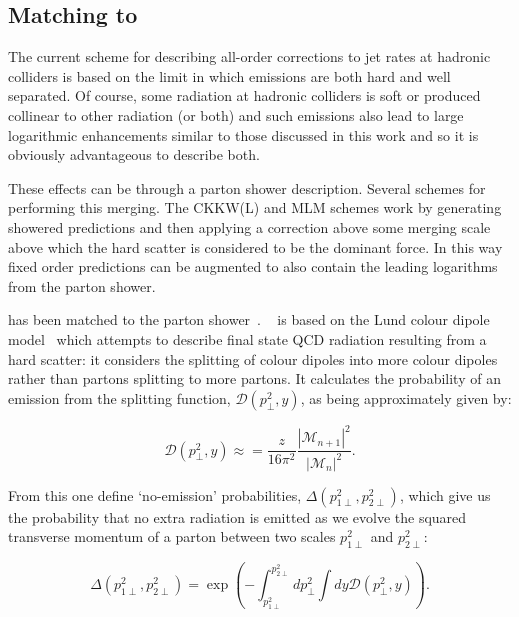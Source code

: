 	\subsection{Matching to \ARIADNE}

		The current scheme for describing all-order corrections to jet rates at hadronic colliders
		is based on the limit in which emissions are both hard and well separated.  Of course, some
		radiation at hadronic colliders is soft or produced collinear to other radiation (or both) and
		such emissions also lead to large logarithmic enhancements similar to those discussed in this
		work and so it is obviously advantageous to describe both.

		These effects can be through a parton shower description.  Several schemes for performing this
		merging.  The CKKW(L) and MLM schemes work by generating showered predictions and then applying
		a correction above some merging scale above which the hard scatter is considered to be the
		dominant force.  In this way fixed order predictions can be augmented to also contain the leading
		logarithms from the parton shower.

		\HEJ has been matched to the \ARIADNE parton shower~\cite{Andersen:2011zd}.  \ARIADNE~\cite{Lonnblad:1992tz}
		is based on the Lund colour dipole model~\cite{Gustafson:180791} which attempts to describe final state QCD
		radiation resulting from a hard scatter: it considers the splitting of colour dipoles into more colour
		dipoles rather than partons splitting to more partons.  It calculates the probability of an emission from
		the splitting function, $\mathcal{D}(p_\perp^2, y)$, as being approximately given by:

		\begin{equation}
			\mathcal{D}(p_\perp^2, y) \approx = \frac{z}{16\pi^2}
			\frac{|\mathcal{M}_{n+1}|^2}{|\mathcal{M}_{n}|^2}.
		\end{equation}

		From this one define `no-emission' probabilities, $\Delta(p_{1\perp}^2, p_{2\perp}^2)$, which
		give us the probability that no extra radiation is emitted as we evolve the squared transverse
		momentum of a parton between two scales $p_{1\perp}^2$ and $p_{2\perp}^2$:

		\begin{equation}
			\Delta(p_{1\perp}^2, p_{2\perp}^2) = \exp\left(-\int_{p_{1\perp}^2}^{p_{2\perp}^2}dp_{\perp}^2
			\int dy\mathcal{D}(p_\perp^2, y)\right).
		\end{equation}

